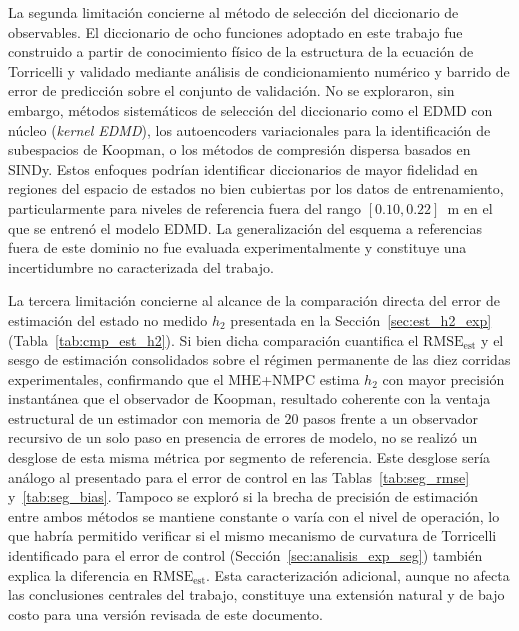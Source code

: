 \documentclass[12pt,letterpaper]{article}
\begin{document}
La segunda limitación concierne al método de selección del 
diccionario de observables. El diccionario de ocho funciones 
adoptado en este trabajo fue construido a partir de 
conocimiento físico de la estructura de la ecuación de 
Torricelli y validado mediante análisis de condicionamiento 
numérico y barrido de error de predicción sobre el conjunto 
de validación. No se exploraron, sin embargo, métodos 
sistemáticos de selección del diccionario como el EDMD con 
núcleo (\textit{kernel EDMD}), los autoencoders variacionales 
para la identificación de subespacios de Koopman, o los 
métodos de compresión dispersa basados en SINDy. Estos 
enfoques podrían identificar diccionarios de mayor fidelidad 
en regiones del espacio de estados no bien cubiertas por los 
datos de entrenamiento, particularmente para niveles de 
referencia fuera del rango $[0.10, 0.22]$~m en el que se 
entrenó el modelo EDMD. La generalización del esquema a 
referencias fuera de este dominio no fue evaluada 
experimentalmente y constituye una incertidumbre no 
caracterizada del trabajo.

La tercera limitación concierne al alcance de la comparación
directa del error de estimación del estado no medido $h_2$
presentada en la Sección~\ref{sec:est_h2_exp}
(Tabla~\ref{tab:cmp_est_h2}). Si bien dicha comparación cuantifica
el $\mathrm{RMSE}_{\mathrm{est}}$ y el sesgo de estimación
consolidados sobre el régimen permanente de las diez corridas
experimentales, confirmando que el MHE+NMPC estima $h_2$ con mayor
precisión instantánea que el observador de Koopman, resultado
coherente con la ventaja estructural de un estimador con memoria
de $20$ pasos frente a un observador recursivo de un solo paso en
presencia de errores de modelo, no se realizó un desglose de
esta misma métrica por segmento de referencia. Este desglose sería
análogo al presentado para el error de control en las
Tablas~\ref{tab:seg_rmse} y~\ref{tab:seg_bias}. Tampoco se exploró
si la brecha de precisión de estimación entre ambos métodos se
mantiene constante o varía con el nivel de operación, lo que
habría permitido verificar si el mismo mecanismo de curvatura de
Torricelli identificado para el error de control
(Sección~\ref{sec:analisis_exp_seg}) también explica la diferencia
en $\mathrm{RMSE}_{\mathrm{est}}$. Esta caracterización adicional,
aunque no afecta las conclusiones centrales del trabajo, constituye
una extensión natural y de bajo costo para una versión revisada de
este documento.
\end{document}
